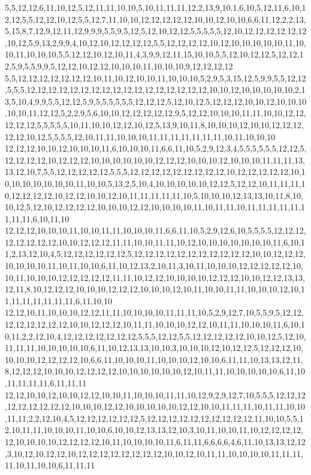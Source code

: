 5,5,12,12,6,11,10,12,5,12,11,11,10,10,5,10,11,11,11,12,2,13,9,10,1,6,10,5,12,11,6,10,12,12,5,5,12,12,10,12,5,5,12,7,11,10,10,12,12,12,12,12,10,10,12,10,10,6,6,11,12,2,2,13,5,15,8,7,12,9,12,11,12,9,9,9,5,5,9,5,12,5,12,10,12,12,5,5,5,5,5,12,10,12,12,12,12,12,12,10,12,5,9,13,2,9,9,4,10,12,10,12,12,12,12,5,5,12,12,12,12,10,12,10,10,10,10,10,11,10,10,11,10,10,10,5,5,12,12,10,12,10,11,4,3,9,9,12,11,15,10,10,5,5,12,10,12,12,5,12,12,12,5,9,5,5,9,9,5,12,12,10,12,12,10,10,10,11,10,10,10,9,12,12,12,12
5,5,12,12,12,12,12,12,12,10,11,10,12,10,10,11,10,10,10,5,2,9,5,3,15,12,5,9,9,5,5,12,12,5,5,5,12,12,12,12,12,12,12,12,12,12,12,12,12,12,12,12,12,10,10,12,10,10,10,10,10,2,13,5,10,4,9,9,5,5,12,12,5,9,5,5,5,5,5,5,12,12,12,5,12,10,12,5,12,12,12,10,10,12,10,10,10,10,10,11,12,12,5,2,2,9,5,6,10,10,12,12,12,12,12,9,5,12,12,10,10,10,11,11,10,10,12,12,12,12,12,5,5,5,5,5,10,11,10,10,12,12,10,12,5,13,9,10,11,8,10,10,10,12,10,10,12,12,12,12,12,10,12,5,5,5,5,12,10,11,11,10,10,10,11,11,11,11,11,11,11,10,11,10,10,10
12,12,12,10,10,12,10,10,10,11,6,10,10,10,11,6,6,11,10,5,2,9,12,3,4,5,5,5,5,5,5,12,12,5,12,12,12,12,10,12,12,12,10,10,10,10,10,10,12,12,12,10,10,10,12,10,10,10,11,11,11,13,13,12,10,7,5,5,12,12,12,12,12,5,5,5,12,12,12,12,12,12,12,12,12,10,12,12,12,12,12,10,10,10,10,10,10,10,10,11,10,10,5,13,2,5,10,4,10,10,10,10,10,12,12,5,12,12,10,11,11,11,10,12,12,12,12,10,12,12,10,10,12,10,11,11,11,11,11,10,5,10,10,10,12,13,13,10,11,8,10,10,12,5,12,10,12,12,12,12,10,10,10,12,12,10,10,10,10,11,10,11,11,10,11,11,11,11,11,11,11,11,6,10,11,10
12,12,12,10,10,10,11,10,10,11,11,10,10,10,11,6,6,11,10,5,2,9,12,6,10,5,5,5,5,12,12,12,12,12,12,12,12,10,10,12,12,12,11,11,10,10,11,11,10,12,10,10,10,10,10,10,10,11,6,10,11,2,13,12,10,4,5,12,12,12,12,12,12,5,12,12,12,12,12,12,12,12,12,12,12,10,10,12,12,12,10,10,10,10,11,10,11,10,10,6,11,10,12,13,2,10,11,3,10,11,10,10,10,12,12,12,12,12,10,10,11,10,10,10,12,12,12,12,12,11,11,10,12,12,10,10,10,10,12,12,12,10,10,12,12,13,13,12,11,8,10,12,12,12,10,10,10,12,12,12,10,10,10,12,10,11,10,10,11,11,10,10,10,12,10,11,11,11,11,11,11,11,6,11,10,10
12,12,10,11,10,10,10,12,12,11,11,10,10,10,10,11,11,11,10,5,2,9,12,7,10,5,5,9,5,12,12,12,12,12,12,12,12,10,10,12,12,12,10,11,11,10,10,10,12,12,10,11,11,10,10,10,11,6,10,10,11,2,2,12,10,4,12,12,12,12,12,12,12,5,5,5,12,12,5,5,12,12,12,12,12,10,10,12,5,12,10,11,11,11,10,10,10,10,10,6,11,10,12,13,13,10,10,3,10,10,10,12,10,12,12,5,12,12,12,10,10,10,10,12,12,12,12,10,6,6,11,10,10,10,11,10,10,10,12,10,10,6,11,11,10,13,13,12,11,8,12,12,12,10,10,10,12,12,12,12,10,10,10,10,10,10,12,10,11,11,10,10,10,10,10,6,11,10,11,11,11,11,6,11,11,11
12,12,10,10,12,10,10,12,12,10,10,11,10,10,10,11,11,10,12,9,2,9,12,7,10,5,5,5,12,12,12,12,12,12,12,12,12,10,10,10,12,12,10,10,10,10,10,12,12,10,10,11,11,11,10,11,11,10,10,11,11,2,2,12,10,4,5,12,12,12,12,12,12,5,12,12,12,12,12,12,12,12,12,12,11,10,10,5,5,12,10,11,11,10,10,10,11,10,10,6,10,10,12,13,13,12,10,3,10,11,10,10,11,10,12,12,12,12,12,10,10,10,10,12,12,12,12,10,11,10,10,10,10,11,6,11,11,6,6,6,6,4,6,11,10,13,13,12,12,3,10,12,10,12,12,10,12,12,12,12,12,12,12,12,10,10,12,10,11,11,10,10,10,10,11,11,11,11,10,11,10,10,6,11,11,11
